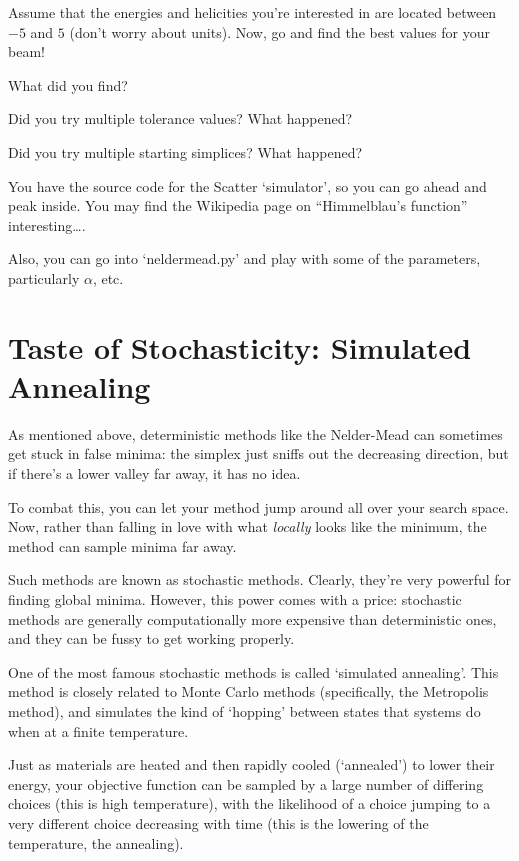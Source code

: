 \documentclass{article}
\begin{document}
    Assume that the energies and 
    helicities you're interested in are located between
    $-5$ and $5$ (don't worry about units). Now, go and
    find the best values for your beam!

    What did you find? 
    
    Did you try multiple tolerance values? What happened?
    
    Did you try multiple starting simplices?
    What happened? 

    You have the source code for the Scatter `simulator', so you
    can go ahead and peak inside. 
    You may find the Wikipedia page on ``Himmelblau's function'' interesting\dots.

    Also, you can go into `neldermead.py' and play with some of the 
    parameters, particularly $\alpha$, etc.

\section*{Taste of Stochasticity: Simulated Annealing}
  As mentioned above, deterministic methods like
  the Nelder-Mead can sometimes get stuck in false minima:
  the simplex just sniffs out the decreasing direction,
  but if there's a lower valley far away, it has no idea.

  To combat this, you can let your method jump around all over your search space.
  Now, rather than falling in love with what \emph{locally} looks like the 
  minimum, the method can sample minima far away.

  Such methods are known as stochastic methods. Clearly, they're very powerful
  for finding global minima. However, this power comes with a price:
  stochastic methods are generally computationally more expensive than
  deterministic ones, and they can be fussy to get working properly.

  One of the most famous stochastic methods is called 
  `simulated annealing'.
  This method is closely related to Monte Carlo methods 
  (specifically, the Metropolis method), and simulates the kind
  of `hopping' between states that systems do when at a finite 
  temperature.
  
  Just as materials are heated and then rapidly cooled
  (`annealed') to lower their energy, 
  your objective function can be sampled by a large number of differing choices
  (this is high temperature), with the likelihood of a choice 
  jumping to a very different choice decreasing with time
  (this is the lowering of the temperature, the annealing).
\end{document}
